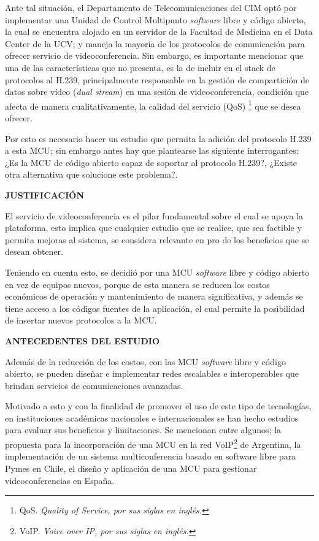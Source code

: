 \documentclass[12pt,letterpaper]{article}
\begin{document}
Ante tal situación, el Departamento de Telecomunicaciones del CIM optó por implementar una Unidad de Control Multipunto \emph{software} libre y código abierto, la cual se encuentra alojado en un servidor de la Facultad de Medicina en el Data Center de la UCV; y maneja la mayoría de los protocolos de comunicación para ofrecer servicio de videoconferencia. Sin embargo, es importante mencionar que una de las características que no presenta, es la de incluir en el stack de protocolos al H.239, principalmente responsable en la gestión de compartición de datos sobre vídeo (\emph{dual stream}) en una sesión de videoconferencia, condición que afecta de manera cualitativamente, la calidad del servicio (QoS) \footnote{QoS. \emph{Quality of Service, por sus siglas en inglés.}} que se desea ofrecer.

Por esto es necesario hacer un estudio que permita la adición del protocolo H.239 a esta MCU; sin embargo antes hay que plantearse las siguiente interrogantes: ¿Es la MCU de código abierto capaz de soportar al protocolo H.239?, ¿Existe otra alternativa que solucione este problema?.        

\centerline{\textbf{JUSTIFICACIÓN}}

El servicio de videoconferencia es el pilar fundamental sobre el cual se apoya la plataforma, esto implica que cualquier estudio que se realice, que sea factible y permita mejoras al sistema, se considera relevante en pro de los beneficios que se desean obtener.

Teniendo en cuenta esto, se decidió por una MCU \emph{software} libre y código abierto en vez de equipos nuevos, porque de esta manera se reducen los costos económicos de operación y mantenimiento de manera significativa, y además se tiene acceso a los códigos fuentes de la aplicación, el cual permite la posibilidad de insertar nuevos protocolos a la MCU. 

\centerline{\textbf{ANTECEDENTES DEL ESTUDIO}}

Además de la reducción de los costos, con las MCU \emph{software} libre y código abierto, se pueden diseñar e implementar redes escalables e interoperables que brindan servicios de comunicaciones avanzadas. 

Motivado a esto y con la finalidad de promover el uso de este tipo de tecnologías, en instituciones académicas nacionales e internacionales se han hecho estudios para evaluar sus beneficios y limitaciones. Se mencionan entre algunos; la propuesta para la incorporación de una MCU en la red VoIP\footnote{VoIP. \emph{Voice over IP, por sus siglas en inglés.}} de Argentina\cite{VoIP}, la implementación de un sistema multiconferencia basado en software libre\cite{inacap} para Pymes en Chile, el diseño y aplicación de una MCU para gestionar videoconferencias\cite{MCUAD} en España. 
\end{document}
